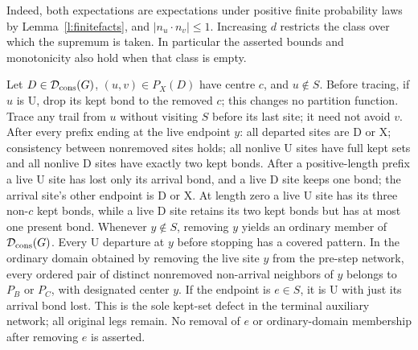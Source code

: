 Indeed, both expectations are expectations under positive finite
probability laws by Lemma~\ref{l:finitefacts}, and
\(|n_u\cdot n_v|\le1\).  Increasing \(d\) restricts the class over
which the supremum is taken.  In particular the asserted bounds and
monotonicity also hold when that class is empty.

\begin{lemma}\label{l:closure}
Let \(D\in\mathcal D_{\rm cons}(G)\), \((u,v)\in P_X(D)\) have
centre \(c\), and \(u\notin S\). Before tracing, if \(u\) is
\(\mathrm U\), drop its kept bond to the removed \(c\); this changes
no partition function. Trace any trail from \(u\) without visiting
\(S\) before its last site; it need not avoid \(v\).
After every prefix ending at the live endpoint \(y\):
all departed sites are \(\mathrm D\) or \(\mathrm X\);
consistency between nonremoved sites holds; all nonlive
\(\mathrm U\) sites have full kept sets and all nonlive \(\mathrm D\)
sites have exactly two kept bonds.
After a positive-length prefix a live \(\mathrm U\) site has lost
only its arrival bond, and a live \(\mathrm D\) site keeps one bond;
the arrival site's other endpoint is \(\mathrm D\) or \(\mathrm X\).
At length zero a live \(\mathrm U\) site has its three non-\(c\)
kept bonds, while a live \(\mathrm D\) site retains its two kept
bonds but has at most one present bond.
Whenever \(y\notin S\), removing \(y\) yields an ordinary member
of \(\mathcal D_{\rm cons}(G)\). Every \(\mathrm U\) departure
at \(y\) before stopping has a covered pattern. In the ordinary
domain obtained by removing the live site \(y\) from the pre-step
network, every ordered pair of distinct nonremoved non-arrival
neighbors of \(y\) belongs to \(P_B\) or \(P_C\), with designated
center \(y\).
If the endpoint is \(e\in S\), it is \(\mathrm U\) with just its
arrival bond lost. This is the sole kept-set defect in the terminal
auxiliary network; all original legs remain. No removal of \(e\)
or ordinary-domain membership after removing \(e\) is asserted.
\end{lemma}

